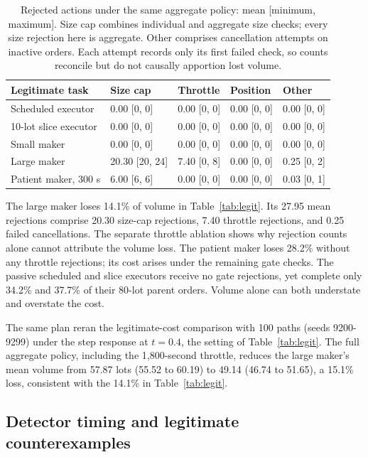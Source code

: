 \documentclass{article}
\begin{document}
\begin{table}[htbp]
\centering
\small
\begin{tabular}{lllll}
\toprule
\textbf{Legitimate task} & \textbf{Size cap} & \textbf{Throttle} & \textbf{Position} & \textbf{Other} \\
\midrule
Scheduled executor & 0.00 [0, 0] & 0.00 [0, 0] & 0.00 [0, 0] & 0.00 [0, 0] \\
10-lot slice executor & 0.00 [0, 0] & 0.00 [0, 0] & 0.00 [0, 0] & 0.00 [0, 0] \\
Small maker & 0.00 [0, 0] & 0.00 [0, 0] & 0.00 [0, 0] & 0.00 [0, 0] \\
Large maker & 20.30 [20, 24] & 7.40 [0, 8] & 0.00 [0, 0] & 0.25 [0, 2] \\
Patient maker, 300 s & 6.00 [6, 6] & 0.00 [0, 0] & 0.00 [0, 0] & 0.03 [0, 1] \\
\bottomrule
\end{tabular}
\caption{Rejected actions under the same aggregate policy: mean [minimum, maximum]. Size cap combines individual and aggregate size checks; every size rejection here is aggregate. Other comprises cancellation attempts on inactive orders. Each attempt records only its first failed check, so counts reconcile but do not causally apportion lost volume.}
\label{tab:rejects}
\end{table}

\renewcommand{\thetable}{\arabic{table}}

The large maker loses 14.1\% of volume in Table~\ref{tab:legit}. Its 27.95 mean rejections comprise 20.30 size-cap rejections, 7.40 throttle rejections, and 0.25 failed cancellations. The separate throttle ablation shows why rejection counts alone cannot attribute the volume loss. The patient maker loses 28.2\% without any throttle rejections; its cost arises under the remaining gate checks. The passive scheduled and slice executors receive no gate rejections, yet complete only 34.2\% and 37.7\% of their 80-lot parent orders. Volume alone can both understate and overstate the cost.

The same plan reran the legitimate-cost comparison with 100 paths (seeds 9200-9299) under the step response at $t = 0.4$, the setting of Table~\ref{tab:legit}. The full aggregate policy, including the 1,800-second throttle, reduces the large maker's mean volume from 57.87 lots (55.52 to 60.19) to 49.14 (46.74 to 51.65), a 15.1\% loss, consistent with the 14.1\% in Table~\ref{tab:legit}.

\subsection{Detector timing and legitimate counterexamples}\label{sec:cadence}
\end{document}
